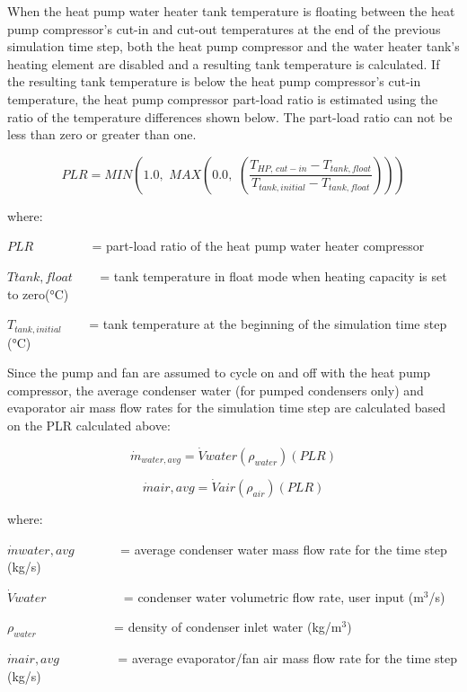 When the heat pump water heater tank temperature is floating between the heat pump compressor's cut-in and cut-out temperatures at the end of the previous simulation time step, both the heat pump compressor and the water heater tank's heating element are disabled and a resulting tank temperature is calculated. If the resulting tank temperature is below the heat pump compressor's cut-in temperature, the heat pump compressor part-load ratio is estimated using the ratio of the temperature differences shown below. The part-load ratio can not be less than zero or greater than one.

\begin{equation}
PLR = MIN\left( {1.0,\,\,MAX\left( {0.0,\,\,\left( {\frac{{{T_{HP,\,cut - in}} - {T_{tank,float}}}}{{{T_{tank,initial}} - {T_{tank,float}}}}} \right)} \right)} \right)
\end{equation}

where:

\(PLR\) ~~~~~~~~ = part-load ratio of the heat pump water heater compressor

\(Ttank,float\) ~~~ = tank temperature in float mode when heating capacity is set to zero(°C)

\({T_{tank,initial}}\) ~~~ = tank temperature at the beginning of the simulation time step (°C)

Since the pump and fan are assumed to cycle on and off with the heat pump compressor, the average condenser water (for pumped condensers only) and evaporator air mass flow rates for the simulation time step are calculated based on the PLR calculated above:

\begin{equation}
{\dot m_{water,avg}} = \dot Vwater\left( {{\rho_{water}}} \right)\left( {PLR} \right)
\end{equation}

\begin{equation}
\dot mair,avg = \dot Vair\left( {{\rho_{air}}} \right)\left( {PLR} \right)
\end{equation}

where:

\(\dot mwater,avg\) ~~~~~~ = average condenser water mass flow rate for the time step (kg/s)

\(\dot Vwater\) ~~~~~~~~~~~ = condenser water volumetric flow rate, user input (m\(^{3}\)/s)

\({\rho_{water}}\) ~~~~~~~~~~~ = density of condenser inlet water (kg/m\(^{3}\))

\(\dot mair,avg\) ~~~~~~~~ = average evaporator/fan air mass flow rate for the time step (kg/s)

